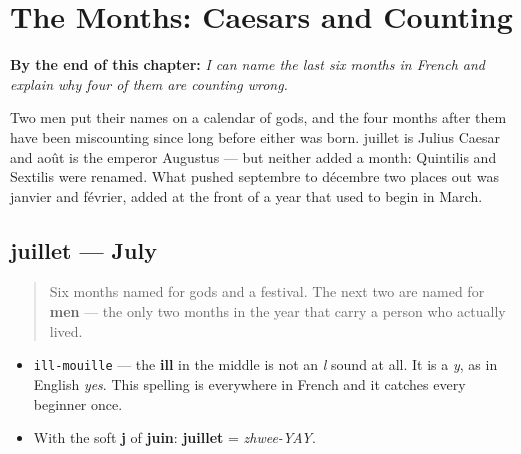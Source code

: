 
\chapter{The Months: Caesars and Counting}
\label{ch:months-caesars}

\begin{chapteropening}
\textbf{By the end of this chapter:} \emph{I can name the last six months in French and explain why four of them are counting wrong.}

Two men put their names on a calendar of gods, and the four months after them have been miscounting since long before either was born. juillet is Julius Caesar and août is the emperor Augustus — but neither added a month: Quintilis and Sextilis were renamed. What pushed septembre to décembre two places out was janvier and février, added at the front of a year that used to begin in March.
\end{chapteropening}

\section[juillet]{juillet — July}

\label{lesson:FR-C09-juillet}



\begin{quote}
Six months named for gods and a festival. The next two are named for \textbf{men} — the only two months in the year that carry a person who actually lived.
\end{quote}

\begin{sounds}
\begin{itemize}
\raggedright
  \item \texttt{ill-mouille} — the \textbf{ill} in the middle is not an \emph{l} sound at all. It is a \emph{y}, as in English \emph{yes}. This spelling is everywhere in French and it catches every beginner once.
  \item With the soft \textbf{j} of \textbf{juin}: \textbf{juillet} = \emph{zhwee-YAY}.
\end{itemize}
\end{sounds}

